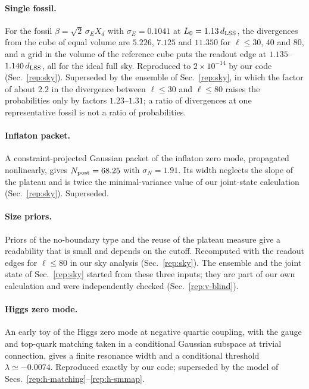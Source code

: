 \paragraph{Single fossil.}
For the fossil $\beta=\sqrt2\,\sigma_EX_d$ with $\sigma_E=0.1041$ at $L_0=1.13\,d_{\mathrm{LSS}}$, the divergences from the cube of equal volume are $5.226$, $7.125$ and $11.350$ for $\ell\le30$, $40$ and $80$, and a grid in the volume of the reference cube puts the readout edge at $1.135$--$1.140\,d_{\mathrm{LSS}}$, all for the ideal full sky. %
Reproduced to $2\times10^{-14}$ by our code (Sec.~\ref{rep:sky}). %
Superseded by the ensemble of Sec.~\ref{rep:sky}, in which the factor of about $2.2$ in the divergence between $\ell\le30$ and $\ell\le80$ raises the probabilities only by factors $1.23$--$1.31$; a ratio of divergences at one representative fossil is not a ratio of probabilities. %

\paragraph{Inflaton packet.}
A constraint-projected Gaussian packet of the inflaton zero mode, propagated nonlinearly, gives $N_{\rm post}=68.25$ with $\sigma_N=1.91$. %
Its width neglects the slope of the plateau and is twice the minimal-variance value of our joint-state calculation (Sec.~\ref{rep:sky}). %
Superseded.

\paragraph{Size priors.}
Priors of the no-boundary type and the reuse of the plateau measure give a readability that is small and depends on the cutoff. %
Recomputed with the readout edges for $\ell\le80$ in our sky analysis (Sec.~\ref{rep:sky}).
The ensemble and the joint state of Sec.~\ref{rep:sky} started from these three inputs; they are part of our own calculation and were independently checked (Sec.~\ref{rep:v-blind}).

\paragraph{Higgs zero mode.}
An early toy of the Higgs zero mode at negative quartic coupling, with the gauge and top-quark matching taken in a conditional Gaussian subspace at trivial connection, gives a finite resonance width and a conditional threshold $\lambda\simeq-0.0074$. %
Reproduced exactly by our code; superseded by the model of Secs.~\ref{rep:h-matching}--\ref{rep:h-smmap}.

